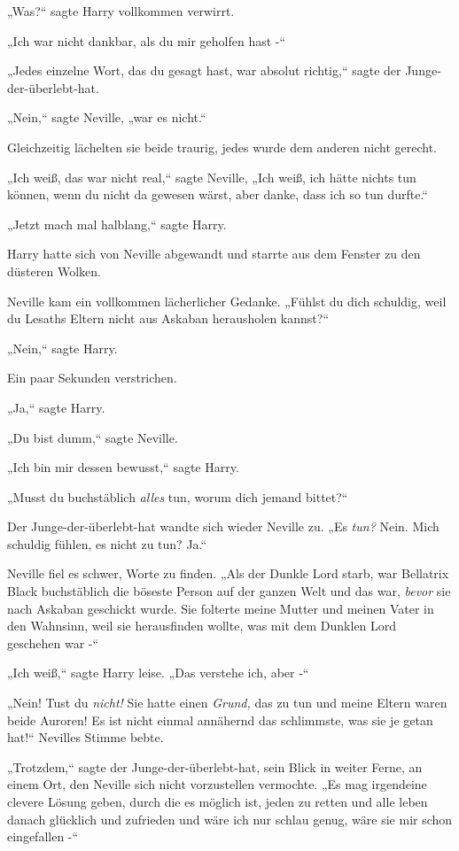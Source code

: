 {„Was?“ sagte Harry vollkommen verwirrt.

„Ich war nicht dankbar, als du mir geholfen hast -“

„Jedes einzelne Wort, das du gesagt hast, war absolut richtig,“ sagte der Junge-der-überlebt-hat.

„Nein,“ sagte Neville, „war es nicht.“

Gleichzeitig lächelten sie beide traurig, jedes wurde dem anderen nicht gerecht.

„Ich weiß, das war nicht real,“ sagte Neville, „Ich weiß, ich hätte nichts tun können, wenn du nicht da gewesen wärst, aber danke, dass ich so tun durfte.“

„Jetzt mach mal halblang,“ sagte Harry.

Harry hatte sich von Neville abgewandt und starrte aus dem Fenster zu den düsteren Wolken.

Neville kam ein vollkommen lächerlicher Gedanke. „Fühlst du dich schuldig, weil du Lesaths Eltern nicht aus Askaban herausholen kannst?“

„Nein,“ sagte Harry.

Ein paar Sekunden verstrichen.

„Ja,“ sagte Harry.

„Du bist dumm,“ sagte Neville.

„Ich bin mir dessen bewusst,“ sagte Harry.

„Musst du buchstäblich \emph{alles} tun, worum dich jemand bittet?“

Der Junge-der-überlebt-hat wandte sich wieder Neville zu. „Es \emph{tun?} Nein. Mich schuldig fühlen, es nicht zu tun? Ja.“

Neville fiel es schwer, Worte zu finden. „Als der Dunkle Lord starb, war Bellatrix Black buchstäblich die böseste Person auf der ganzen Welt und das war, \emph{bevor} sie nach Askaban geschickt wurde. Sie folterte meine Mutter und meinen Vater in den Wahnsinn, weil sie herausfinden wollte, was mit dem Dunklen Lord geschehen war -“

„Ich weiß,“ sagte Harry leise. „Das verstehe ich, aber -“

„Nein! Tust du \emph{nicht!} Sie hatte einen \emph{Grund,} das zu tun und meine Eltern waren beide Auroren! Es ist nicht einmal annähernd das schlimmste, was sie je getan hat!“ Nevilles Stimme bebte.

„Trotzdem,“ sagte der Junge-der-überlebt-hat, sein Blick in weiter Ferne, an einem Ort, den Neville sich nicht vorzustellen vermochte. „Es mag irgendeine clevere Lösung geben, durch die es möglich ist, jeden zu retten und alle leben danach glücklich und zufrieden und wäre ich nur schlau genug, wäre sie mir schon eingefallen -“

}
